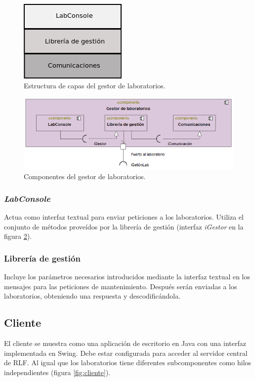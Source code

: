 \begin{figure}[h]
	\centering
	\includegraphics[scale=0.65]{images/labconsole.png}
	\caption[Gestor de laboratorios por capas]{Estructura de capas del gestor de 
	laboratorios.}
	\label{fig:labconsole}
\end{figure}

\begin{figure}[h]
	\centering
	\includegraphics[scale=0.65]{images/Gestor.png}
	\caption[Gestor de laboratorios]{Componentes del gestor de 
	laboratorios.}
	\label{fig:gestorlab}
\end{figure}

\subsubsection{\emph{LabConsole}}
Actua como interfaz textual para enviar peticiones a los laboratorios. 
Utiliza el conjunto de métodos proveídos por la librería de gestión 
(interfaz \emph{iGestor} en la figura \ref{fig:gestorlab}).

\subsubsection{Librería de gestión}
Incluye los parámetros necesarios introducidos mediante la interfaz 
textual en los mensajes para las peticiones de mantenimiento. Después 
serán enviadas a los laboratorios, obteniendo una respuesta y 
descodificándola.

\subsection{Cliente}
El cliente se muestra como una aplicación de escritorio en Java con 
una interfaz implementada en Swing. Debe estar configurada para 
acceder al servidor central de RLF. Al igual que los laboratorios 
tiene diferentes subcomponentes como hilos independientes (figura 
\ref{fig:cliente}).

